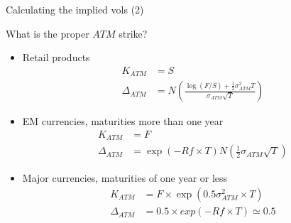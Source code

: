 \documentclass[ignorenonframetext,aspectratio=169]{beamer}
\newenvironment{Shaded}{}{}
\newcommand{\DecValTok}[1]{\textcolor[rgb]{0.25,0.63,0.44}{#1}}
\newcommand{\FloatTok}[1]{\textcolor[rgb]{0.25,0.63,0.44}{#1}}
\newcommand{\StringTok}[1]{\textcolor[rgb]{0.25,0.44,0.63}{#1}}
\newcommand{\CommentTok}[1]{\textcolor[rgb]{0.38,0.63,0.69}{\textit{#1}}}
\newcommand{\OperatorTok}[1]{\textcolor[rgb]{0.40,0.40,0.40}{#1}}
\newcommand{\NormalTok}[1]{#1}
\providecommand{\tightlist}{%
  \setlength{\itemsep}{0pt}\setlength{\parskip}{0pt}}
\begin{document}
\begin{frame}[fragile]{Calculating the implied vols (2)}

\begin{Shaded}
\end{Shaded}

\end{frame}

\begin{frame}{What is the proper \(ATM\) strike?}

\begin{itemize}
\tightlist
\item
  Retail products \[
  \begin{aligned}
  K_{ATM} &= S\\
  \Delta_{ATM} &= N \left(\frac{\log(F/S) + \frac{1}{2} \sigma_{ATM}^2 T}{\sigma_{ATM} \sqrt T} \right)
  \end{aligned}
  \]
\item
  EM currencies, maturities more than one year \[
  \begin{aligned}
  K_{ATM} &= F\\
  \Delta_{ATM} &= \exp(-Rf \times T)N(\frac{1}{2}\sigma_{ATM} \sqrt T) 
  \end{aligned}
  \]
\item
  Major currencies, maturities of one year or less \[
  \begin{aligned}
   K_{ATM} &= F \times \exp\left( 0.5 \sigma^2_{ATM}\times T \right)\\
   \Delta_{ATM} &= 0.5\times exp(-Rf \times T) \simeq 0.5 
  \end{aligned}
  \]
\end{itemize}

\end{frame}
\end{document}
